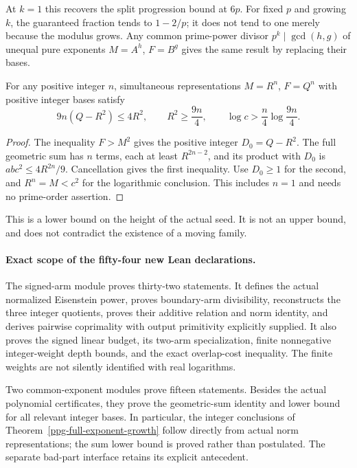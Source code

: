 At $k=1$ this recovers the split progression bound at $6p$. For fixed
$p$ and growing $k$, the guaranteed fraction tends to $1-2/p$; it
does not tend to one merely because the modulus grows. Any common
prime-power divisor $p^k\mid\gcd(h,g)$ of unequal pure exponents
$M=A^h$, $F=B^g$ gives the same result by replacing their bases.

\begin{theorem}
\label{ppg-full-exponent-growth}
For any positive integer $n$, simultaneous representations $M=R^n$,
$F=Q^n$ with positive integer bases satisfy
\[
 9n(Q-R^2)\le4R^2,\qquad R^2\ge\frac{9n}{4},\qquad
 \log c>\frac n4\log\frac{9n}{4}.
\]
\end{theorem}
\begin{proof}
The inequality $F>M^2$ gives the positive integer $D_0=Q-R^2$.
The full geometric sum has $n$ terms, each at least $R^{2n-2}$,
and its product with $D_0$ is $ab c^2\le4R^{2n}/9$.
Cancellation gives the first inequality. Use $D_0\ge1$ for the
second, and $R^n=M<c^2$ for the logarithmic conclusion.
This includes $n=1$ and needs no prime-order assertion.
\end{proof}

This is a lower bound on the height of the actual seed. It is not an
upper bound, and does not contradict the existence of a moving family.

\paragraph{Exact scope of the fifty-four new Lean declarations.}
The signed-arm module proves thirty-two statements. It defines the actual
normalized Eisenstein power, proves boundary-arm divisibility, reconstructs
the three integer quotients, proves their additive relation and norm identity,
and derives pairwise coprimality with output primitivity explicitly supplied.
It also proves the signed linear budget, its two-arm specialization, finite
nonnegative integer-weight depth bounds, and the exact overlap-cost inequality.
The finite weights are not silently identified with real logarithms.

Two common-exponent modules prove fifteen statements. Besides the actual
polynomial certificates, they prove the geometric-sum identity and lower
bound for all relevant integer bases. In particular, the integer conclusions
of Theorem~\ref{ppg-full-exponent-growth} follow directly from actual norm
representations; the sum lower bound is proved rather than postulated.
The separate bad-part interface retains its explicit antecedent.

